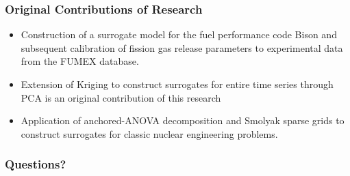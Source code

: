 \begin{frame}
\frametitle{Original Contributions of Research}

\begin{itemize}
  \item Construction of a surrogate model for the fuel performance code Bison and subsequent calibration of fission gas release parameters to experimental data from the FUMEX database. 
  \item Extension of Kriging to construct surrogates for entire time series through PCA is an original contribution of this research
  \item Application of anchored-ANOVA decomposition and Smolyak sparse grids to construct surrogates for classic nuclear engineering problems.
\end{itemize}

\end{frame}
\begin{frame}
\frametitle{Questions?}

\end{frame}














